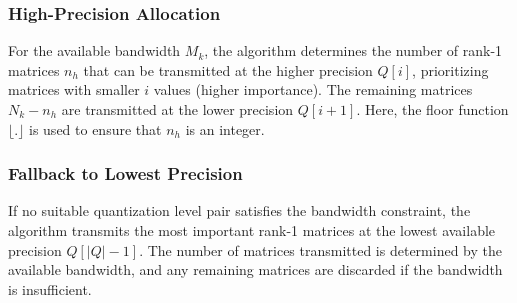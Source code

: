 \documentclass[journal]{IEEEtran}
\begin{document}
\subsubsection{High-Precision Allocation}
For the available bandwidth \(M_k\), the algorithm determines the number of rank-1 matrices \(n_h\) that can be transmitted at the higher precision \(Q[i]\), prioritizing matrices with smaller \(i\) values (higher importance). The remaining matrices \(N_k - n_h\) are transmitted at the lower precision \(Q[i+1]\). Here, the floor function \(\lfloor . \rfloor\) is used to ensure that \(n_h\) is an integer.


\subsubsection{Fallback to Lowest Precision}
If no suitable quantization level pair satisfies the bandwidth constraint, the algorithm transmits the most important rank-1 matrices at the lowest available precision \(Q[|Q|-1]\). The number of matrices transmitted is determined by the available bandwidth, and any remaining matrices are discarded if the bandwidth is insufficient.
\end{document}
